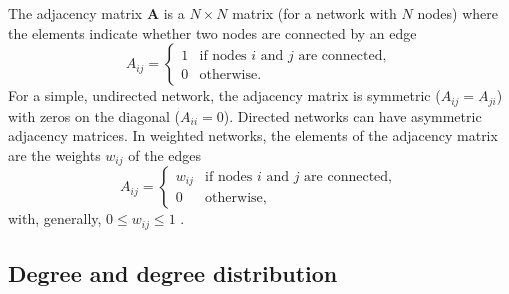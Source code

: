 \documentclass[11 pt , letterpaper , twoside , openright]{book}
\begin{document}
The adjacency matrix \textbf{A} is a $N \times N$ matrix (for a network with $N$ nodes) where the elements indicate whether two nodes are connected by an edge \cite{Mata2020}
\begin{equation}
	A_{ij} = 
	\begin{cases}
		1 & \text{if nodes $i$ and $j$ are connected},\\
		0 & \text{otherwise}.
	\end{cases}
\end{equation}
For a simple, undirected network, the adjacency matrix is symmetric ($A_{ij} = A_{ji}$) with zeros on the diagonal ($A_{ii} = 0$). Directed networks can have asymmetric adjacency matrices. In weighted networks, the elements of the adjacency matrix are the weights $w_{ij}$ of the edges
\begin{equation}
	A_{ij} = 
	\begin{cases}
		w_{ij} & \text{if nodes $i$ and $j$ are connected},\\
		0 & \text{otherwise},
	\end{cases}
\end{equation}
with, generally, $0 \leqslant w_{ij} \leqslant 1$ \cite{Mata2020}. 

\subsection{Degree and degree distribution}
\end{document}
